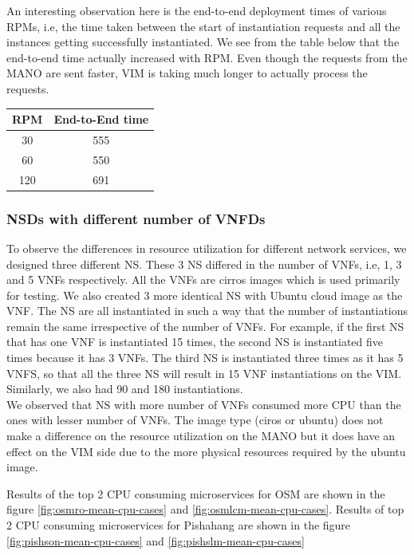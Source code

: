 An interesting observation here is the end-to-end deployment times of various RPMs, i.e, the time taken between the start of instantiation requests and all the instances getting successfully instantiated. We see from the table below that the end-to-end time actually increased with RPM. Even though the requests from the MANO are sent faster, VIM is taking much longer to actually process the requests. \\

\begin{tabular}{|c|c|}
\hline 
\textbf{RPM} & \textbf{End-to-End time}\\ 
\hline 
30 & 555 \\ 
\hline 
60 & 550 \\ 
\hline 
120 & 691 \\ 
\hline 
\end{tabular} 

\subsubsection{NSDs with different number of VNFDs}
To observe the differences in resource utilization for different network services, we designed three different NS. These 3 NS differed in the number of VNFs, i.e, 1, 3 and 5 VNFs respectively.  All the VNFs are cirros images which is used primarily for testing. We also created 3 more identical NS with Ubuntu cloud image as the VNF. The NS are all instantiated in such a way that the number of instantiations remain the same irrespective of the number of VNFs.
For example, if the first NS that has one VNF is instantiated 15 times, the second NS is instantiated five times because it has 3 VNFs. 
The third NS is instantiated three times as it has 5 VNFS, so that all the three NS will result in 15 VNF instantiations on the VIM. 
Similarly, we also had 90 and 180 instantiations.\\

We observed that NS with more number of VNFs consumed more CPU than the ones with lesser number of VNFs. The image type (ciros or ubuntu) does not make a difference on the resource utilization on the MANO but it does have an effect on the VIM side due to the more physical resources required by the ubuntu image.

Results of the top 2 CPU consuming microservices for OSM are shown in the figure \ref{fig:osmro-mean-cpu-cases} and \ref{fig:osmlcm-mean-cpu-cases}. Results of top 2 CPU consuming microservices for Pishahang are shown in the figure \ref{fig:pishson-mean-cpu-cases} and \ref{fig:pishslm-mean-cpu-cases}


